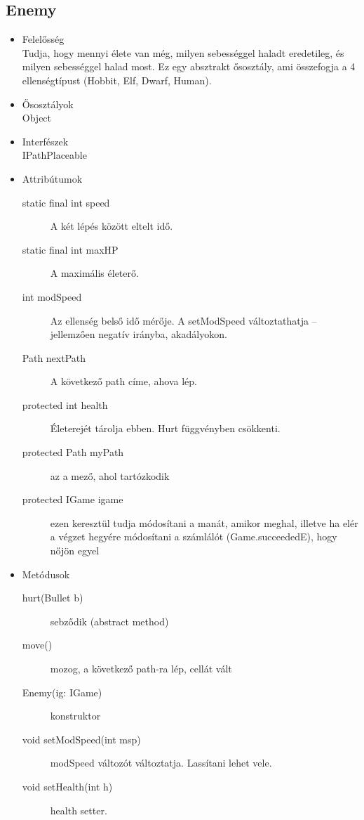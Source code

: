 \subsection{Enemy}
\begin{itemize}
\item Felelősség\\
Tudja, hogy mennyi élete van még, milyen sebességgel haladt eredetileg, és milyen sebességgel halad most. Ez egy absztrakt ősosztály, ami összefogja a 4 ellenségtípust (Hobbit, Elf, Dwarf, Human).
\item Ősosztályok\\
Object
\item Interfészek\\
IPathPlaceable
\item Attribútumok\\
	\begin{description}
		\item[static final int speed] A két lépés között eltelt idő.
		\item [static final int maxHP] A maximális életerő.
\item[int modSpeed] Az ellenség belső idő mérője. A setModSpeed változtathatja – jellemzően negatív irányba, akadályokon.
\item[Path nextPath] A következő path címe, ahova lép.
\item[protected int health] Életerejét tárolja ebben. Hurt függvényben csökkenti.
\item[protected Path myPath] az a mező, ahol tartózkodik
\item[protected IGame igame] ezen keresztül tudja módosítani a manát, amikor meghal, illetve ha elér a végzet hegyére módosítani a számlálót (Game.succeededE), hogy nőjön egyel

	\end{description}
\item Metódusok\\
	\begin{description}
		\item[hurt(Bullet b)] sebződik (abstract method)
\item[move()] mozog, a következő path-ra lép, cellát vált
\item[Enemy(ig: IGame)] konstruktor
\item[void setModSpeed(int msp)] modSpeed változót változtatja. Lassítani lehet vele.
\item[void setHealth(int h)] health setter.

	\end{description}
\end{itemize}

